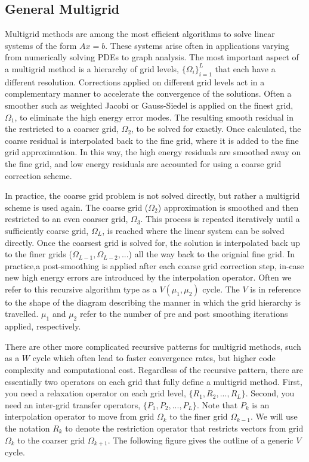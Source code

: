 \documentclass{article}
\begin{document}
\subsection{General Multigrid}

Multigrid methods are among the most efficient algorithms to solve linear systems of the form $Ax=b$.  These systems arise often in applications varying from numerically solving PDEs to graph analysis.  The most important aspect of a multigrid method is a hierarchy of grid levels, $\{\Omega_i\}_{i=1}^L$ that each have a different resolution.  Corrections applied on different grid levels act in a complementary manner to accelerate the convergence of the solutions.  Often a smoother such as weighted Jacobi or Gauss-Siedel is applied on the finest grid, $\Omega_1$, to eliminate the high energy error modes. The resulting smooth residual in the restricted to a coarser grid, $\Omega_2$, to be solved for exactly.  Once calculated, the coarse residual is interpolated back to the fine grid, where it is added to the fine grid approximation. In this way, the high energy residuals are smoothed away on the fine grid, and low energy residuals are accounted for using a coarse grid correction scheme.

In practice, the coarse grid problem is not solved directly, but rather a multigrid scheme is used again.  The coarse grid ($\Omega_2$) approximation is smoothed and then restricted to an even coarser grid, $\Omega_3$.  This process is repeated iteratively until a sufficiently coarse grid, $\Omega_L$, is reached where the linear system can be solved directly.  Once the coarsest grid is solved for, the solution is interpolated back up to the finer grids ($\Omega_{L-1}, \Omega_{L-2},...$) all the way back to the orignial fine grid.  In practice,a post-smoothing is applied after each coarse grid correction step, in-case new high energy errors are introduced by the interpolation operator.  Often we refer to this recursive algorithm type as a $V(\mu_1,\mu_2)$ cycle. The $V$ is in reference to the shape of the diagram describing the manner in which the grid hierarchy is travelled.  $\mu_1$ and $\mu_2$ refer to the number of pre and post smoothing iterations applied, respectively.

There are other more complicated recursive patterns for multigrid methods, such as a $W$ cycle which often lead to faster convergence rates, but higher code complexity and computational cost.  Regardless of the recursive pattern, there are essentially two operators on each grid that fully define a multigrid method. First, you need a  relaxation operator on each grid level, $\{R_1,R_2,...,R_L\}$. Second, you need an inter-grid transfer operators, $\{P_1,P_2,...,P_L\}$.  Note that $P_k$ is an interpolation operator to move from grid $\Omega_k$ to the finer grid $\Omega_{k-1}$.  We will use the notation $R_k$ to denote the restriction operator that restricts vectors from grid $\Omega_k$ to the coarser grid $\Omega_{k+1}$.  The following figure gives the outline of a generic $V$ cycle.
\end{document}
